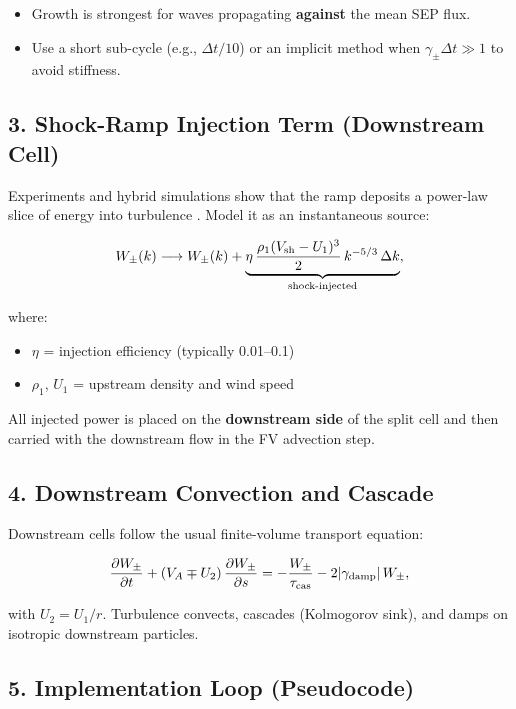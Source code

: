 \begin{itemize}
    \item Growth is strongest for waves propagating \textbf{against} the mean SEP flux.
    \item Use a short sub-cycle (e.g., $\Delta t/10$) or an implicit method when $\gamma_\pm \Delta t \gg 1$ to avoid stiffness.
\end{itemize}

\subsection*{3. Shock-Ramp Injection Term (Downstream Cell)}

Experiments and hybrid simulations show that the ramp deposits a power-law slice of energy into turbulence \cite{Liu2006, Caprioli2014}.  
Model it as an instantaneous source:

\begin{equation}
W_\pm(k) \longrightarrow
W_\pm(k) + 
\underbrace{
\eta\,\frac{\rho_1 (V_{\rm sh} - U_1)^3}{2}\,
k^{-5/3}\,\Delta k
}_{\text{shock-injected}},
\end{equation}

where:
\begin{itemize}
    \item $\eta$ = injection efficiency (typically 0.01–0.1)
    \item $\rho_1$, $U_1$ = upstream density and wind speed
\end{itemize}

All injected power is placed on the \textbf{downstream side} of the split cell and then carried with the downstream flow in the FV advection step.

\subsection*{4. Downstream Convection and Cascade}

Downstream cells follow the usual finite-volume transport equation:

\begin{equation}
\frac{\partial W_\pm}{\partial t}
+ (V_A \mp U_2)\,\frac{\partial W_\pm}{\partial s}
= -\frac{W_\pm}{\tau_{\rm cas}} - 2|\gamma_{\rm damp}|\,W_\pm,
\end{equation}

with $U_2 = U_1 / r$.  
Turbulence convects, cascades (Kolmogorov sink), and damps on isotropic downstream particles.

\subsection*{5. Implementation Loop (Pseudocode)}

